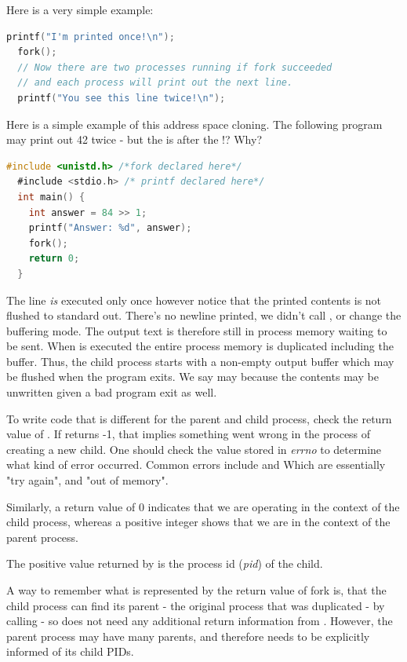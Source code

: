 \begin{itemize}
\begin{itemize}
Here is a very simple example:

\begin{lstlisting}[language=C]
  printf("I'm printed once!\n");
  fork();
  // Now there are two processes running if fork succeeded
  // and each process will print out the next line.
  printf("You see this line twice!\n");
\end{lstlisting}

Here is a simple example of this address space cloning.
The following program may print out 42 twice - but the  is after the !? Why?

\begin{lstlisting}[language=C]
  #include <unistd.h> /*fork declared here*/
  #include <stdio.h> /* printf declared here*/
  int main() {
    int answer = 84 >> 1;
    printf("Answer: %d", answer);
    fork();
    return 0;
  }
\end{lstlisting}

The  line \emph{is} executed only once however notice that the printed contents is not flushed to standard out.
There's no newline printed, we didn't call , or change the buffering mode.
The output text is therefore still in process memory waiting to be sent.
When  is executed the entire process memory is duplicated including the buffer.
Thus, the child process starts with a non-empty output buffer which may be flushed when the program exits.
We say may because the contents may be unwritten given a bad program exit as well.

To write code that is different for the parent and child process, check the return value of .
If  returns -1, that implies something went wrong in the process of creating a new child.
One should check the value stored in \emph{errno} to determine what kind of error occurred.
Common errors include  and  Which are essentially "try again", and "out of memory".

Similarly, a return value of 0 indicates that we are operating in the context of the child process, whereas a positive integer shows that we are in the context of the parent process.

The positive value returned by  is the process id (\emph{pid}) of the child.

A way to remember what is represented by the return value of fork is, that the child process can find its parent - the original process that was duplicated - by calling  - so does not need any additional return information from . However, the parent process may have many parents, and therefore needs to be explicitly informed of its child PIDs.


\end{itemize}
\end{itemize}
